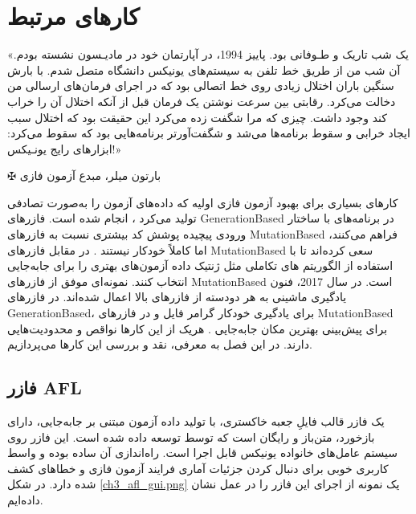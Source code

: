 
\chapter{کارهای مرتبط}\label{related_work}
\thispagestyle{empty}
\epigraph{
	«یک شب تاریک و طـوفانی بود. پاییز 1994، در آپارتمان خود در مادیـسون نشسته بودم. آن شب من از طریق خط تلفن به سیستم‌های یونیکس دانشگاه متصل شدم. با بارش سنگین باران اختلال زیادی روی خط اتصالی بود که در اجرای فرمان‌های ارسالی من دخالت می‌کرد. رقابتی بین سرعت نوشتن یک فرمان قبل از آنکه اختلال آن را خراب کند وجود داشت. چیزی که مرا شگفت زده می‌کرد این حقیقت بود که اختلال سبب ایجاد خرابی و سقوط برنامه‌ها می‌شد و شگفت‌آورتر برنامه‌هایی بود که سقوط می‌کرد: ابزارهای رایج یونـیکس!»
}
{$ \maltese $ {\large بارتون میلر، مبدع آزمون فازی}}

\noindent
کارهای بسیاری برای بهبود آزمون فازی اولیه که داده‌های آزمون را به‌صورت تصادفی تولید می‌کرد \cite{Miller:1990:ESR:96267.96279}، انجام شده است. فازرهای \gls{GenerationBased} در برنامه‌های با ساختار ورودی پیچیده پوشش کد بیشتری نسبت به فازرهای \gls{MutationBased} فراهم می‌کنند\cite{Miller2007}، اما کاملاً خودکار نیستند \cite{Godefroid:2017:LML:3155562.3155573}. در مقابل فازرهای \gls{MutationBased} سعی کرده‌اند تا با استفاده از الگوریتم ‌های تکاملی مثل ژنتیک داده‌ آزمون‌های بهتری را برای جابه‌جایی انتخاب کنند.  \cite{Zalewsky2013} نمونه‌ای موفق از فازرهای \gls{MutationBased} است. در سال 2017، فنون یادگیری ماشینی به هر دودسته از فازرهای بالا اعمال شده‌اند. در فازرهای \gls{GenerationBased}، برای یادگیری خودکار گرامر فایل \cite{Godefroid:2017:LML:3155562.3155573} و در فازرهای \gls{MutationBased} برای پیش‌بینی بهترین مکان جابه‌جایی \cite{DBLP:journals/corr/abs-1711-04596}. هریک از این کارها نواقص و محدودیت‌هایی دارند. در این فصل به معرفی، نقد و بررسی این کارها می‌پردازیم.



\section{فازر AFL}
 \cite{Zalewsky2013}
 یک فازر قالب فایلِ جعبه خاکستری، با تولید داده آزمون مبتنی بر جابه‌جایی، دارای بازخورد، متن‌باز و رایگان است که توسط 
  توسعه داده شده است. این فازر روی سیستم عامل‌های خانواده یونیکس قابل اجرا است. راه‌اندازی آن ساده بوده و واسط کاربری خوبی برای دنبال کردن جزئیات آماری فرایند آزمون فازی و خطاهای کشف شده دارد. در ‏شکل \ref{ch3_afl_gui.png} یک نمونه از اجرای این فازر را در عمل نشان داده‌ایم.
  
